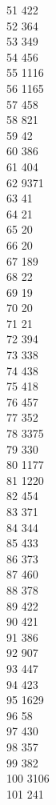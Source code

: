 { 51	422 \\
 52	364 \\
 53	349 \\
 54	456 \\
 55	1116 \\
 56	1165 \\
 57	458 \\
 58	821 \\
 59	42 \\
 60	386 \\
 61	404 \\
 62	9371 \\
 63	41 \\
 64	21 \\
 65	20 \\
 66	20 \\
 67	189 \\
 68	22 \\
 69	19 \\
 70	20 \\
 71	21 \\
 72	394 \\
 73	338 \\
 74	438 \\
 75	418 \\
 76	457 \\
 77	352 \\
 78	3375 \\
 79	330 \\
 80	1177 \\
 81	1220 \\
 82	454 \\
 83	371 \\
 84	344 \\
 85	433 \\
 86	373 \\
 87	460 \\
 88	378 \\
 89	422 \\
 90	421 \\
 91	386 \\
 92	907 \\
 93	447 \\
 94	423 \\
 95	1629 \\
 96	58 \\
 97	430 \\
 98	357 \\
 99	382 \\
 100	3106 \\
 101	241 \\
}
